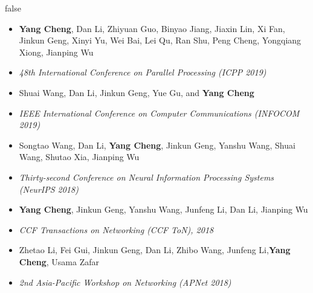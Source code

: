 \documentclass{resume}
\begin{document}
\if false
\begin{itemize}
	\item \textbf{Yang Cheng}, Dan Li, Zhiyuan Guo, Binyao Jiang, Jiaxin Lin, Xi Fan, Jinkun Geng, Xinyi Yu, Wei Bai, Lei Qu, Ran Shu, Peng Cheng, Yongqiang Xiong, Jianping Wu
	\item \textit{48th International Conference on Parallel Processing (ICPP 2019)}
\end{itemize}

\begin{itemize}
	\item Shuai Wang, Dan Li, Jinkun Geng, Yue Gu, and \textbf{Yang Cheng}
	\item \textit{IEEE International Conference on Computer Communications (INFOCOM 2019)}
\end{itemize}

\begin{itemize}
	\item Songtao Wang, Dan Li, \textbf{Yang Cheng}, Jinkun Geng, Yanshu Wang, Shuai Wang, Shutao Xia, Jianping Wu
	\item \textit{Thirty-second Conference on Neural Information Processing Systems (NeurIPS 2018)}
\end{itemize}


\begin{itemize}
	\item \textbf{Yang Cheng}, Jinkun Geng, Yanshu Wang, Junfeng Li, Dan Li, Jianping Wu
	\item \textit{CCF Transactions on Networking (CCF ToN), 2018}
\end{itemize}

\begin{itemize}
	\item Zhetao Li, Fei Gui, Jinkun Geng, Dan Li, Zhibo Wang, Junfeng Li,\textbf{Yang Cheng}, Usama Zafar
	\item \textit{2nd Asia-Pacific Workshop on Networking (APNet 2018)}
\end{itemize}
\end{document}

